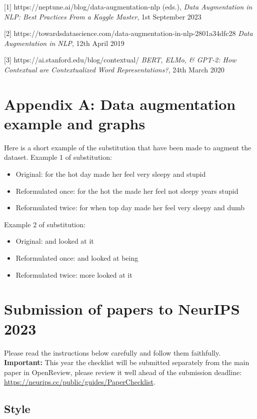\documentclass{article}
\begin{document}
{
\small


[1] https://neptune.ai/blog/data-augmentation-nlp 
(eds.), {\it Data Augmentation in NLP: Best Practices From a Kaggle Master}, 1st September 2023



[2] https://towardsdatascience.com/data-augmentation-in-nlp-2801a34dfc28 {\it Data Augmentation in NLP},  12th April 2019


[3] https://ai.stanford.edu/blog/contextual/ {\it BERT, ELMo, & GPT-2: How Contextual are Contextualized Word Representations?},  24th March 2020
}

\newpage


\section{Appendix A: Data augmentation example and graphs}

Here is a short example of the substitution that have been made to augment the dataset.
Example 1 of substitution:
\begin{itemize}
    \item Original: for the hot day made her feel very sleepy and stupid
    \item Reformulated once: for the hot the made her feel not sleepy years stupid
    \item Reformulated twice: for when top day made her feel very sleepy and dumb
\end{itemize}
Example 2 of substitution:
\begin{itemize}
    \item Original: and looked at it 
    \item Reformulated once: and looked at being 
    \item Reformulated twice: more looked at it 
\end{itemize}

\newpage


\section{Submission of papers to NeurIPS 2023}

Please read the instructions below carefully and follow them faithfully. \textbf{Important:} This year the checklist will be submitted separately from the main paper in OpenReview, please review it well ahead of the submission deadline: \url{https://neurips.cc/public/guides/PaperChecklist}.


\subsection{Style}
\end{document}
